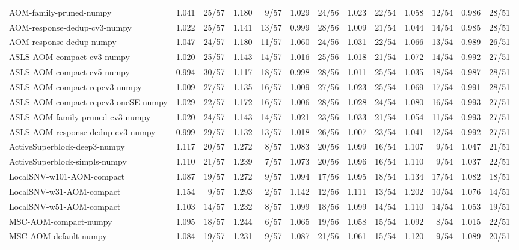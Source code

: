 \begin{tabular}{lrrrrrrrrrrrr}
AOM-family-pruned-numpy & 1.041 & 25/57 & 1.180 & 9/57 & 1.029 & 24/56 & 1.023 & 22/54 & 1.058 & 12/54 & 0.986 & 28/51 \\
AOM-response-dedup-cv3-numpy & 1.022 & 25/57 & 1.141 & 13/57 & 0.999 & 28/56 & 1.009 & 21/54 & 1.044 & 14/54 & 0.985 & 28/51 \\
AOM-response-dedup-numpy & 1.047 & 24/57 & 1.180 & 11/57 & 1.060 & 24/56 & 1.031 & 22/54 & 1.066 & 13/54 & 0.989 & 26/51 \\
ASLS-AOM-compact-cv3-numpy & 1.020 & 25/57 & 1.143 & 14/57 & 1.016 & 25/56 & 1.018 & 21/54 & 1.072 & 14/54 & 0.992 & 27/51 \\
ASLS-AOM-compact-cv5-numpy & 0.994 & 30/57 & 1.117 & 18/57 & 0.998 & 28/56 & 1.011 & 25/54 & 1.035 & 18/54 & 0.987 & 28/51 \\
ASLS-AOM-compact-repcv3-numpy & 1.009 & 27/57 & 1.135 & 16/57 & 1.009 & 27/56 & 1.023 & 25/54 & 1.069 & 17/54 & 0.991 & 28/51 \\
ASLS-AOM-compact-repcv3-oneSE-numpy & 1.029 & 22/57 & 1.172 & 16/57 & 1.006 & 28/56 & 1.028 & 24/54 & 1.080 & 16/54 & 0.993 & 27/51 \\
ASLS-AOM-family-pruned-cv3-numpy & 1.020 & 24/57 & 1.143 & 14/57 & 1.021 & 23/56 & 1.033 & 21/54 & 1.054 & 11/54 & 0.993 & 27/51 \\
ASLS-AOM-response-dedup-cv3-numpy & 0.999 & 29/57 & 1.132 & 13/57 & 1.018 & 26/56 & 1.007 & 23/54 & 1.041 & 12/54 & 0.992 & 27/51 \\
ActiveSuperblock-deep3-numpy & 1.117 & 20/57 & 1.272 & 8/57 & 1.083 & 20/56 & 1.099 & 16/54 & 1.107 & 9/54 & 1.047 & 21/51 \\
ActiveSuperblock-simpls-numpy & 1.110 & 21/57 & 1.239 & 7/57 & 1.073 & 20/56 & 1.096 & 16/54 & 1.110 & 9/54 & 1.037 & 22/51 \\
LocalSNV-w101-AOM-compact & 1.087 & 19/57 & 1.272 & 9/57 & 1.094 & 17/56 & 1.095 & 18/54 & 1.134 & 17/54 & 1.082 & 18/51 \\
LocalSNV-w31-AOM-compact & 1.154 & 9/57 & 1.293 & 2/57 & 1.142 & 12/56 & 1.111 & 13/54 & 1.202 & 10/54 & 1.076 & 14/51 \\
LocalSNV-w51-AOM-compact & 1.103 & 14/57 & 1.232 & 8/57 & 1.099 & 18/56 & 1.099 & 14/54 & 1.110 & 14/54 & 1.053 & 19/51 \\
MSC-AOM-compact-numpy & 1.095 & 18/57 & 1.244 & 6/57 & 1.065 & 19/56 & 1.058 & 15/54 & 1.092 & 8/54 & 1.015 & 22/51 \\
MSC-AOM-default-numpy & 1.084 & 19/57 & 1.231 & 9/57 & 1.087 & 21/56 & 1.061 & 15/54 & 1.120 & 9/54 & 1.089 & 20/51 \\

\end{tabular}
